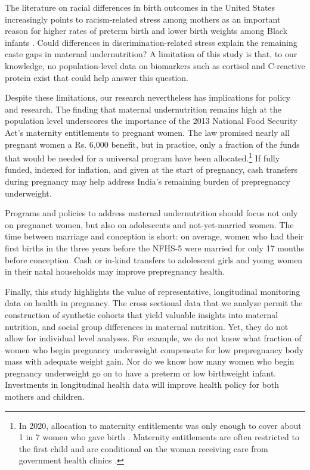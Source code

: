 \documentclass[12pt]{article}
\begin{document}
The literature on racial differences in birth outcomes in the United States increasingly points to racism-related stress among mothers as an important reason for higher rates of preterm birth and lower birth weights among Black infants \citep{hogue2005stress, sosnaud2021cross}. Could differences in discrimination-related stress explain the remaining caste gaps in maternal undernutrition? A limitation of this study is that, to our knowledge, no population-level data on biomarkers such as cortisol and C-reactive protein exist that could help answer this question. 

Despite these limitations, our research nevertheless has implications for policy and research.  The finding that maternal undernutrition remains high at the population level underscores the importance of the 2013 National Food Security Act's maternity entitlements to pregnant women. The law promised nearly all pregnant women a Rs. 6,000 benefit, but in practice, only a fraction of the funds that would be needed for a universal program have been allocated.\footnote{In 2020, allocation to maternity entitlements was only enough to cover about 1 in 7 women who gave birth \cite{dreze2021derailed}.  Maternity entitlements are often restricted to the first child and are conditional on the woman receiving care from government health clinics \citep{kalra2020birth}.}  If fully funded, indexed for inflation, and given at the start of pregnancy, cash transfers during pregnancy may help address India's remaining burden of prepregnancy underweight. 

Programs and policies to address maternal undernutrition should focus not only on pregnanct women, but also on adolescents and not-yet-married women.  The time  between marriage and conception is short: on average, women who had their first births in the three years before the NFHS-5 were married for only 17 months before conception.  Cash or in-kind transfers to adolescent girls and young women in their natal households may improve prepregnancy health.  

Finally, this study highlights the value of representative, longitudinal monitoring data on health in pregnancy.  The cross sectional data that we analyze permit the construction of synthetic cohorts that yield valuable insights into maternal nutrition, and social group differences in maternal nutrition.  Yet, they do not allow for individual level analyses.  For example, we do not know what fraction of women who begin pregnancy underweight compensate for low prepregnancy body mass with adequate weight gain.  Nor do we know how many women who begin pregnancy underweight go on to have a preterm or low birthweight infant.  Investments in longitudinal health data will improve health policy for both mothers and children.
\end{document}
